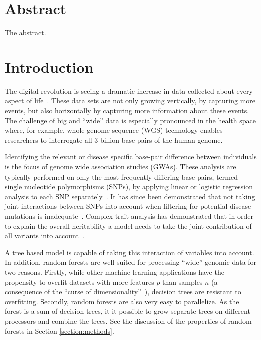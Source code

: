 \documentclass[10pt,letterpaper]{article}
\begin{document}
\clearpage

\section{Abstract}
The abstract.

\linenumbers

\section{Introduction}
The digital revolution is seeing a dramatic increase in data collected about every aspect of life~\cite{Loebbecke2015}.
These data sets are not only growing vertically, by capturing more events, but also horizontally by capturing
more information about these events.  The challenge of big and ``wide'' data is especially pronounced in the health
space where, for example, whole genome sequence (WGS) technology enables researchers to interrogate all 3 billion base pairs of the
human genome.

Identifying the relevant or disease specific base-pair difference between individuals is the focus of genome wide
association studies (GWAs).  These analysis are typically performed on only the most frequently differing base-pairs, termed
single nucleotide polymorphisms (SNPs), by applying linear or logistic regression analysis to each SNP separately~\cite{CCC2007}.  It has since been
demonstrated that not taking joint interactions between SNPs into account when filtering for potential disease mutations
is inadequate~\cite{Manolio2009}.  
Complex trait analysis has demonstrated that in order to explain the overall
heritability a model needs to take the joint contribution of all variants into account~\cite{Yang2011}.

A tree based model is capable of taking this interaction of variables
into account. In addition, random forests are well suited for
processing ``wide'' genomic data for two reasons.  Firstly, while other machine learning applications have the
propensity to overfit datasets with more features $p$ than samples $n$ (a consequence of the ``curse of
dimensionality''~\cite{Bauer2014, bellman1961adaptive}), decision trees are resistant to overfitting. 
Secondly, random forests are also very easy to parallelize. As the forest is a sum of decision trees, it it possible to grow
separate trees on different processors and combine the trees. See the
discussion of the properties of random forests in Section \ref{section:methods}.
\end{document}
